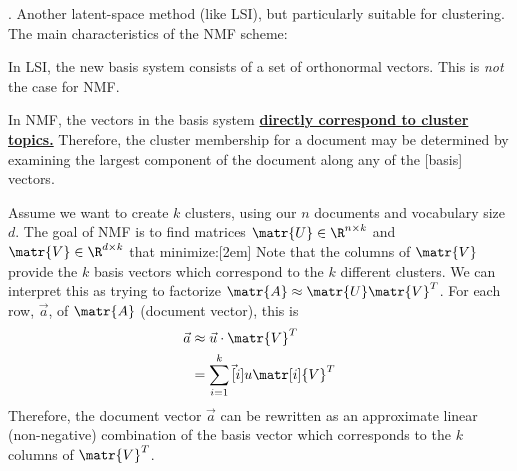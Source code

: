 \documentclass[11pt]{article}
\begin{document}
\myspace
\p {}. Another latent-space method (like LSI), but particularly suitable for clustering. The main characteristics of the NMF scheme:
\begin{compactitem}
	\item In LSI, the new basis system consists of a set of orthonormal vectors. This is \textit{not} the case for NMF.
	
	\item In NMF, the vectors in the basis system \textbf{\underline{directly correspond to cluster topics.}} Therefore, the cluster membership for a document may be determined by examining the largest component of the document along any of the [basis] vectors.
\end{compactitem}
\p Assume we want to create $k$ clusters, using our $n$ documents and vocabulary size $d$. The goal of NMF is to find matrices $\matr{U} \in \R^{n \times k}$ and $\matr{V} \in \R^{d \times k}$ that minimize:[2em]
Note that the columns of $\matr{V}$ provide the $k$ basis vectors which correspond to the $k$ different clusters. We can interpret this as trying to factorize $\matr{A} \approx \matr{U} \matr{V}^T$. For each row, $\vec{a}$, of $\matr{A}$ (document vector), this is 
\begin{align}
	\vec{a} &\approx \vec{u} \cdot \matr{V}^T \\
	&= \sum_{i = 1}^{k} \vec[i]{u} \matr[i]{V}^T
\end{align}
Therefore, the document vector $\vec{a}$ can be rewritten as an approximate linear (non-negative) combination of the basis vector which corresponds to the $k$ columns of $\matr{V}^T$. \\
\end{document}
